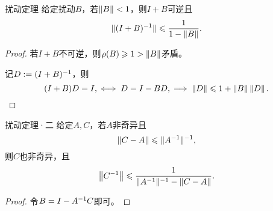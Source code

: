 \begin{theorem}
    {扰动定理}{}
    给定扰动$B$，若$\left\lVert B\right\rVert<1$，则$I+B$可逆且
    \begin{equation}
        \lVert(I+B)^{-1}\rVert\leqslant\frac1{1-\left\lVert B\right\rVert}.
    \end{equation}
\end{theorem}

\begin{proof}
    若$I+B$不可逆，则$\rho(B)\geqslant 1>\left\lVert B\right\rVert$矛盾。

    记$D:=(I+B)^{-1}$，则 
    \[
        (I+B)D=I,\iff D=I-BD,\implies \left\lVert D\right\rVert\leqslant 1+\left\lVert B\right\rVert\left\lVert D\right\rVert.
        \qedhere
    \]
\end{proof}

\begin{theorem}
    {扰动定理·二}{}
    给定$A,C$，若$A$非奇异且
    \[
        \left\lVert C-A\right\rVert\leqslant\lVert A^{-1}\rVert^{-1},
    \]
    则$C$也非奇异，且
    \begin{equation}
        \left\lVert C^{-1}\right\rVert\leqslant\frac{1}{\lVert A^{-1}\rVert^{-1}-\left\lVert C-A\right\rVert}.
    \end{equation}
\end{theorem}

\begin{proof}
    令$B=I-A^{-1} C$即可。
\end{proof}



